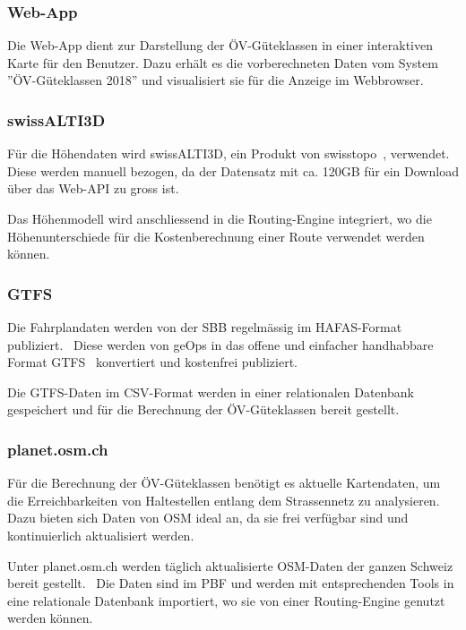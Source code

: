 \subsubsection{Web-App}
\label{subsystem:Web-App}

Die Web-App dient zur Darstellung der ÖV-Güteklassen in einer interaktiven Karte für den Benutzer.
Dazu erhält es die vorberechneten Daten vom System ''ÖV-Güteklassen 2018'' und visualisiert sie für die Anzeige im Webbrowser.

\subsubsection{swissALTI3D}
\label{subsystem:swissALTI3D}

Für die Höhendaten wird swissALTI3D, ein Produkt von swisstopo~\cite{swissalti3d_swisstopo}, verwendet.
Diese werden manuell bezogen, da der Datensatz mit ca. 120GB für ein Download über das Web-API zu gross ist.

Das Höhenmodell wird anschliessend in die Routing-Engine integriert, wo die Höhenunterschiede für die Kostenberechnung einer Route verwendet werden können.

\subsubsection{GTFS}
\label{subsystem:GTFS}

Die Fahrplandaten werden von der SBB regelmässig im HAFAS-Format publiziert.~\cite{sbb_hafas_spec}
Diese werden von geOps in das offene und einfacher handhabbare Format \ac{GTFS}~\cite{gtfs_spec} konvertiert und kostenfrei publiziert.~\cite{geops_fahrplandaten}

Die \ac{GTFS}-Daten im CSV-Format werden in einer relationalen Datenbank gespeichert und für die Berechnung der ÖV-Güteklassen bereit gestellt.

\subsubsection{planet.osm.ch}
\label{subsystem:planet.osm.ch}

Für die Berechnung der ÖV-Güteklassen benötigt es aktuelle Kartendaten, um die Erreichbarkeiten von Haltestellen entlang dem Strassennetz zu analysieren.
Dazu bieten sich Daten von \ac{OSM} ideal an, da sie frei verfügbar sind und kontinuierlich aktualisiert werden.

Unter planet.osm.ch werden täglich aktualisierte \ac{OSM}-Daten der ganzen Schweiz bereit gestellt.~\cite{planet_osm_ch}
Die Daten sind im \ac{PBF} und werden mit entsprechenden Tools in eine relationale Datenbank importiert, wo sie von einer Routing-Engine genutzt werden können.


